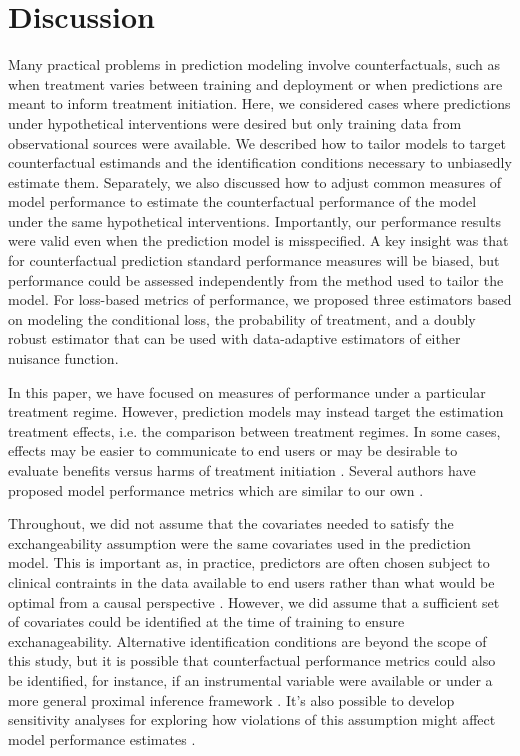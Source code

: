 \section{Discussion} \label{sec:discussion}
Many practical problems in prediction modeling involve counterfactuals, such as when treatment varies between training and deployment or when predictions are meant to inform treatment initiation. Here, we considered cases where predictions under hypothetical interventions were desired but only training data from observational sources were available. We described how to tailor models to target counterfactual estimands and the identification conditions necessary to unbiasedly estimate them. Separately, we also discussed how to adjust common measures of model performance to estimate the counterfactual performance of the model under the same hypothetical interventions. Importantly, our performance results were valid even when the prediction model is misspecified. A key insight was that for counterfactual prediction standard performance measures will be biased, but performance could be assessed independently from the method used to tailor the model. For loss-based metrics of performance, we proposed three estimators based on modeling the conditional loss, the probability of treatment, and a doubly robust estimator that can be used with data-adaptive estimators of either nuisance function. 

In this paper, we have focused on measures of performance under a particular treatment regime. However, prediction models may instead target the estimation treatment effects, i.e. the comparison between treatment regimes. In some cases, effects may be easier to communicate to end users or may be desirable to evaluate benefits versus harms of treatment initiation \cite{kent_predictive_2020}. Several authors have proposed model performance metrics which are similar to our own \cite{schuler_comparison_2018,rolling2014model,xu_calibration_2022,van2003unified,alaa_validating_2019}.

Throughout, we did not assume that the covariates needed to satisfy the exchangeability assumption were the same covariates used in the prediction model. This is important as, in practice,  predictors are often chosen subject to clinical contraints in the data available to end users rather than what would be optimal from a causal perspective \cite{steyerberg_clinical_2019}. However, we did assume that a sufficient set of covariates could be identified at the time of training to ensure exchanageability. Alternative identification conditions are beyond the scope of this study, but it is possible that counterfactual performance metrics could also be identified, for instance, if an instrumental variable \cite{hernan_instruments_2006} were available or under a more general proximal inference framework \cite{tchetgen_introduction_2020}. It's also possible to develop sensitivity analyses for exploring how violations of this assumption might affect model performance estimates \cite{robins_sensitivity_2000}.

